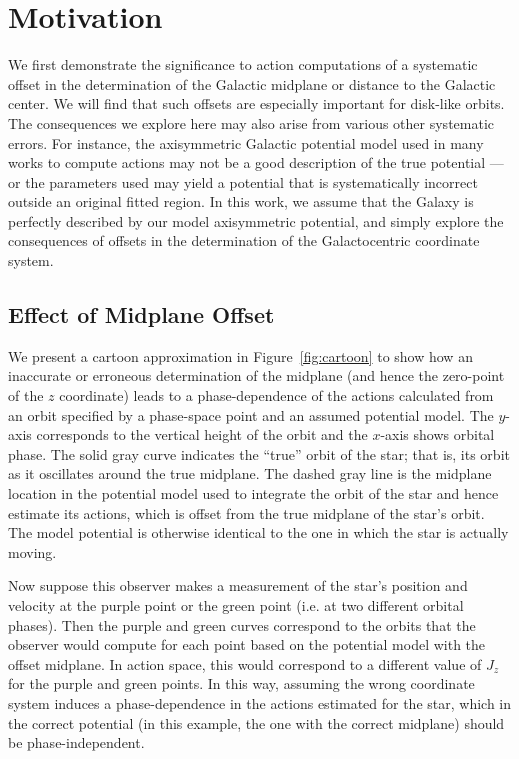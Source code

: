 \documentclass[twocolumn]{aastex62}
\begin{document}
\section{Motivation} \label{sec:ref_frame}
We first demonstrate the significance  to
action computations of a systematic offset in the
determination of the Galactic midplane or distance to the Galactic center. We will find that such offsets are especially important
for disk-like orbits. The consequences we explore here may also arise from
various other systematic errors. For instance, the axisymmetric Galactic
potential model used in many works to compute actions may not be a good
description of the true potential --- or the parameters used may yield a
potential that is systematically incorrect outside an original fitted region.
In this work, we assume that the Galaxy is perfectly described by our model
axisymmetric potential, and simply explore the consequences of offsets in the determination of the Galactocentric coordinate system.

\subsection{Effect of Midplane Offset} \label{ssec:cartoon}
We present a cartoon approximation in Figure~\ref{fig:cartoon} to show how an
inaccurate or erroneous determination of the midplane (and hence the zero-point of the $z$ coordinate) leads to a phase-dependence of the
actions calculated from an orbit specified by a phase-space point and an
assumed potential model. The $y$-axis corresponds to the vertical height of
the orbit and the $x$-axis shows orbital phase. The solid gray curve indicates the
``true'' orbit of the star; that is, its orbit as it oscillates around the
true midplane. The dashed gray line is the midplane location in the
potential model used to integrate the orbit of the star and
hence estimate its actions, which is offset from the true midplane of the star's orbit. The model potential is otherwise identical to the one in which the star is actually moving.

Now suppose this observer makes a measurement of the star's position and velocity at the purple
point or the green point (i.e. at two different orbital phases). Then the
purple and green curves correspond to the orbits that the observer would
compute for each point based on the potential model with the offset
midplane. In action space, this would correspond to a different value of $J_z$
for the purple and green points. In this way, assuming the wrong coordinate
system induces a phase-dependence in the actions estimated for the star, which
in the correct potential (in this example, the one with the correct midplane)
should be phase-independent.
\end{document}

